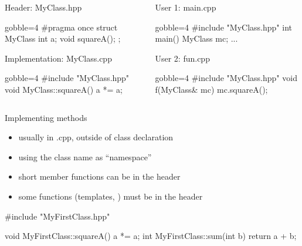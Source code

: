\begin{frame}[fragile]
  \begin{columns}[t]
    \begin{column}{.45\textwidth}
    \begin{block}{Header: MyClass.hpp}
      \begin{cppcode*}{gobble=4}
        #pragma once
        struct MyClass {
          int a;
          void squareA();
        };
      \end{cppcode*}
    \end{block}
    \begin{block}{Implementation: MyClass.cpp}
      \begin{cppcode*}{gobble=4}
        #include "MyClass.hpp"
        void MyClass::squareA() {
          a *= a;
        }
      \end{cppcode*}
    \end{block}
    \end{column}
    \begin{column}{.45\textwidth}
    \begin{block}{User 1: main.cpp}
      \begin{cppcode*}{gobble=4}
        #include "MyClass.hpp"
        int main() {
          MyClass mc;
          ...
        }
      \end{cppcode*}
    \end{block}
    \begin{block}{User 2: fun.cpp}
      \begin{cppcode*}{gobble=4}
        #include "MyClass.hpp"
        void f(MyClass& mc) {
          mc.squareA();
        }
      \end{cppcode*}
    \end{block}
    \end{column}
  \end{columns}
\end{frame}

\begin{frame}[fragile]
  \begin{goodpractice}{Implementing methods}
    \begin{itemize}
    \item usually in .cpp, outside of class declaration
    \item using the class name as ``namespace''
    \item short member functions can be in the header
    \item some functions (templates, ) must be in the header
    \end{itemize}
  \end{goodpractice}
  \begin{block}{}
    \begin{cppcode}
    #include "MyFirstClass.hpp"

    void MyFirstClass::squareA() {
      a *= a;
    }
    int MyFirstClass::sum(int b) {
      return a + b;
    }
    \end{cppcode}
  \end{block}
\end{frame}


